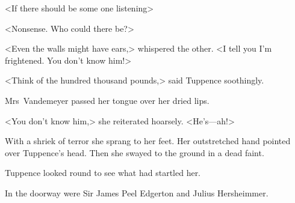 <If there should be some one listening\longdash>

<Nonsense. Who could there be?>

<Even the walls might have ears,> whispered the other. <I tell you I'm frightened. You don't know him!>

<Think of the hundred thousand pounds,> said Tuppence soothingly.

Mrs~Vandemeyer passed her tongue over her dried lips.

<You don't know him,> she reiterated hoarsely. <He's—ah!>

With a shriek of terror she sprang to her feet. Her outstretched hand pointed over Tuppence's head. Then she swayed to the ground in a dead faint.

Tuppence looked round to see what had startled her.

In the doorway were Sir James Peel Edgerton and Julius Hersheimmer. 
